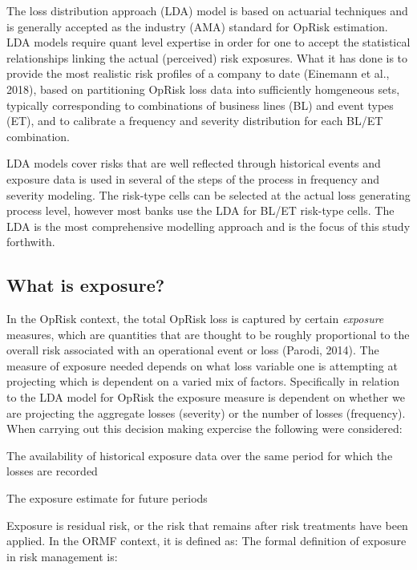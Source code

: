 \documentclass{DissertateUSU}
\begin{document}
The loss distribution approach (LDA) model is based on actuarial
techniques and is generally accepted as the industry (AMA) standard for
OpRisk estimation. LDA models require quant level expertise in order for
one to accept the statistical relationships linking the actual
(perceived) risk exposures. What it has done is to provide the most
realistic risk profiles of a company to date (Einemann et al., 2018),
based on partitioning OpRisk loss data into sufficiently homgeneous
sets, typically corresponding to combinations of business lines (BL) and
event types (ET), and to calibrate a frequency and severity distribution
for each BL/ET combination.\medskip

LDA models cover risks that are well reflected through historical events
and exposure data is used in several of the steps of the process in
frequency and severity modeling. The risk-type cells can be selected at
the actual loss generating process level, however most banks use the LDA
for BL/ET risk-type cells. The LDA is the most comprehensive modelling
approach and is the focus of this study forthwith. \medskip

\subsection{What is exposure?}
\label{sec:What is exposure?}

In the OpRisk context, the total OpRisk loss is captured by certain
\emph{exposure} measures, which are quantities that are thought to be
roughly proportional to the overall risk associated with an operational
event or loss (Parodi, 2014). The measure of exposure needed depends on
what loss variable one is attempting at projecting which is dependent on
a varied mix of factors. Specifically in relation to the LDA model for
OpRisk the exposure measure is dependent on whether we are projecting
the aggregate losses (severity) or the number of losses (frequency).
When carrying out this decision making expercise the following were
considered:

\begin{list}{*}{}
\item The availability of historical exposure data over the same period for which the losses are recorded
\item The exposure estimate for future periods
\end{list}
\medskip

Exposure is residual risk, or the risk that remains after risk
treatments have been applied. In the ORMF context, it is defined as: The
formal definition of exposure in risk management is:
\end{document}

